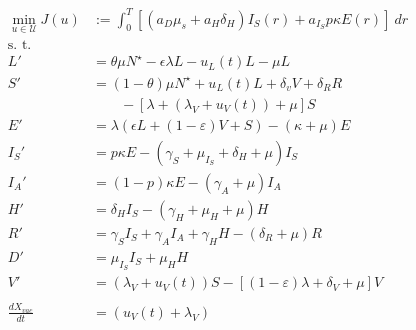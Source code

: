 \begin{equation}
    \label{eqn:vital_dynamics}
    \begin{aligned}
        \min_{u \in \mathcal{U}} J(u) & :=
                \int_{0} ^ T
                [\left(
                    a_D \mu_s + a_H \delta_H
                \right) I_S(r) +
                a_{I_S} p  \kappa E(r) ]\ dr
        \\
            \text{s. t.} &
        \\
            L' & =  \theta \mu N^{\star}
                -\epsilon \lambda L - u_L(t) L - \mu L
        \\
            S' & =
                (1 - \theta) \mu N^\star
                + u_L(t) L
                + \delta_v V
                + \delta_R R
        \\
                & \qquad -
                \left[
                	\lambda + (\lambda_V + u_V(t)) + \mu
                \right] S
        \\
            E' &=
                \lambda (\epsilon L + (1-\varepsilon) V + S)
                - (\kappa + \mu) E
        \\
            I_S' &=
                p \kappa E
                - (\gamma_S +
                    \mu_{I_S} +
                    \delta_H +
                    \mu) I_S
        \\
            I_A' &=
                (1 - p) \kappa E - (\gamma_A + \mu) I_A
        \\
            H' &=
                \delta_H I_S - (\gamma_H + \mu_H + \mu) H
        \\
            R'  &=
                \gamma_S I_S +
                \gamma_A I_A +
                \gamma_H H %
                - (\delta_R + \mu) R
        \\
            D' &=
                \mu_{I_S} I_S + \mu_H H
        \\
            V' &=
                (\lambda_V + u_V(t)) S
                - \left[
                	(1 - \varepsilon) \lambda
                	+ \delta_V
                	+ \mu
                \right ] V
        \\
        \\
            \frac{dX_{vac}}{dt}
            	&=
            	(u_V(t) + \lambda_V)

\end{aligned}
\end{equation}
